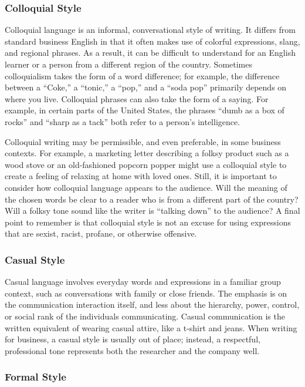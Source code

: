 \subsubsection{Colloquial Style}

Colloquial language is an informal, conversational style of writing. It differs from standard business English in that it often makes use of colorful expressions, slang, and regional phrases. As a result, it can be difficult to understand for an English learner or a person from a different region of the country. Sometimes colloquialism takes the form of a word difference; for example, the difference between a ``Coke,'' a ``tonic,'' a ``pop,'' and a ``soda pop'' primarily depends on where you live. Colloquial phrases can also take the form of a saying. For example, in certain parts of the United States, the phrases ``dumb as a box of rocks'' and ``sharp as a tack'' both refer to a person's intelligence.

Colloquial writing may be permissible, and even preferable, in some business contexts. For example, a marketing letter describing a folksy product such as a wood stove or an old-fashioned popcorn popper might use a colloquial style to create a feeling of relaxing at home with loved ones. Still, it is important to consider how colloquial language  appears to the audience. Will the meaning of the chosen words be clear to a reader who is from a different part of the country? Will a folksy tone sound like the writer is ``talking down'' to the audience? A final point to remember is that colloquial style is not an excuse for using expressions that are sexist, racist, profane, or otherwise offensive.

\subsubsection{Casual Style}

Casual language involves everyday words and expressions in a familiar group context, such as conversations with family or close friends. The emphasis is on the communication interaction itself, and less about the hierarchy, power, control, or social rank of the individuals communicating. Casual communication is the written equivalent of wearing casual attire, like a t-shirt and jeans. When writing for business, a casual style is usually out of place; instead, a respectful, professional tone represents both the researcher and the company well.

\subsubsection{Formal Style}

